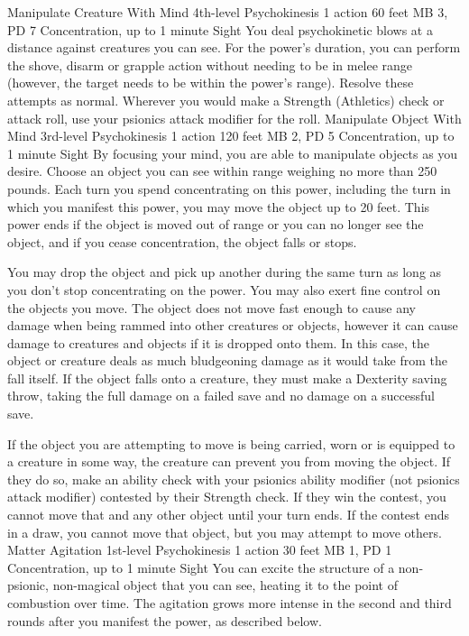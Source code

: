 \DndPowerHeader%
    {Manipulate Creature With Mind\label{pwr:manipulate_creature_with_mind}}
    {4th-level Psychokinesis}
    {1 action}
    {60 feet}
    {MB 3, PD 7}
    {Concentration, up to 1 minute}
    {Sight}
You deal psychokinetic blows at a distance
against creatures you can see. For the power's duration,
you can perform the shove, disarm or grapple action without
needing to be in melee range (however, the target needs to
be within the power's range).
Resolve these attempts as normal. Wherever you
would make a Strength (Athletics) check or attack roll, use
your psionics attack modifier for the roll.
\DndPowerHeader%
    {Manipulate Object With Mind\label{pwr:manipulate_object_with_mind}}
    {3rd-level Psychokinesis}
    {1 action}
    {120 feet}
    {MB 2, PD 5}
    {Concentration, up to 1 minute}
    {Sight}
By focusing your mind, you are able to manipulate
objects as you desire. Choose an object you can see within
range weighing no more than 250 pounds. Each turn you spend
concentrating on this power, including the turn in which you
manifest this power, you may move the object up to 20 feet.
This power ends if the object is moved out of range or you
can no longer see the object, and if you cease concentration,
the object falls or stops.

You may drop the object and pick up another during the same
turn as long as you don't stop concentrating on the power.
You may also exert fine control on the objects you move. The
object does not move fast enough to cause any damage when
being rammed into other creatures or objects, however it can
cause damage to creatures and objects if it is dropped onto
them. In this case,
the object or creature deals as much bludgeoning
damage as it would take from the fall itself. If the object
falls onto a creature, they must make a Dexterity saving throw,
taking the full damage on a failed save and no damage on a
successful save.

If the object you are attempting to move is being carried,
worn or is equipped to a creature in some way, the creature
can prevent you from moving the object. If they do so, make
an ability check with your psionics ability modifier (not
psionics attack modifier) contested by their Strength check.
If they win the contest, you cannot move that and any other
object until your turn ends. If the contest ends in a draw,
you cannot move that object, but you may attempt to move others.
\DndPowerHeader%
    {Matter Agitation\label{pwr:matter_agitation}}
    {1st-level Psychokinesis}
    {1 action}
    {30 feet}
    {MB 1, PD 1}
    {Concentration, up to 1 minute}
    {Sight}
You can excite the structure of a non-psionic,
non-magical object that you can see,
heating it to the point of combustion over time.
The agitation grows more intense in the second and third rounds
after you manifest the power, as described below.

